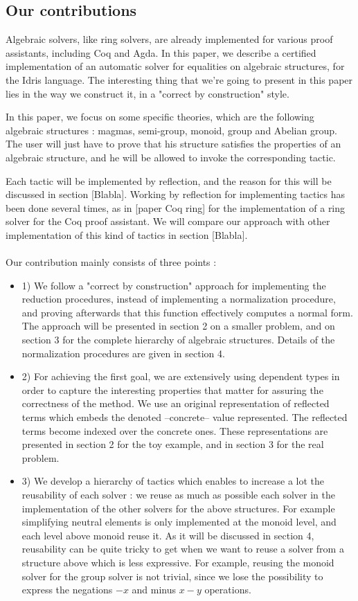 \subsection{Our contributions}

Algebraic solvers, like ring solvers, are already implemented for various proof assistants, including Coq and Agda. In this paper, we describe a certified implementation of an automatic solver for equalities on algebraic structures, for the Idris language. The interesting thing that we're going to present in this paper lies in the way we construct it, in a "correct by construction" style.

In this paper, we focus on some specific theories, which are the following algebraic structures : magmas, semi-group, monoid, group and Abelian group.
The user will just have to prove that his structure satisfies the properties of an algebraic structure, and he will be allowed to invoke the corresponding tactic.

Each tactic will be implemented by reflection, and the reason for this will be discussed in section [Blabla]. Working by reflection for implementing tactics has been done several times, as in [paper Coq ring] for the implementation of a ring solver for the Coq proof assistant. We will compare our approach with other implementation of this kind of tactics in section [Blabla]. \\
\\
Our contribution mainly consists of three points :
\begin{itemize}
	\item 1) We follow a "correct by construction" approach for implementing the reduction procedures, instead of implementing a normalization procedure, and proving afterwards that this function effectively computes a normal form. The approach will be presented in section 2 on a smaller problem, and on section 3 for the complete hierarchy of algebraic structures. Details of the normalization procedures are given in section 4.
	\item 2) For achieving the first goal, we are extensively using dependent types in order to capture the interesting properties that matter for assuring the correctness of the method. We use an original representation of reflected terms which embeds the denoted --concrete-- value represented. The reflected terms become indexed over the concrete ones. These representations are presented in section 2 for the toy example, and in section 3 for the real problem.
	\item 3) We develop a hierarchy of tactics which enables to increase a lot the reusability of each solver : we reuse as much as possible each solver in the implementation of the other solvers for the above structures. For example simplifying neutral elements is only implemented at the monoid level, and each level above monoid reuse it. As it will be discussed in section 4, reusability can be quite tricky to get when we want to reuse a solver from a structure above which is less expressive. For example, reusing the monoid solver for the group solver is not trivial, since we lose the possibility to express the negations $-x$ and minus $x-y$ operations.
\end{itemize}